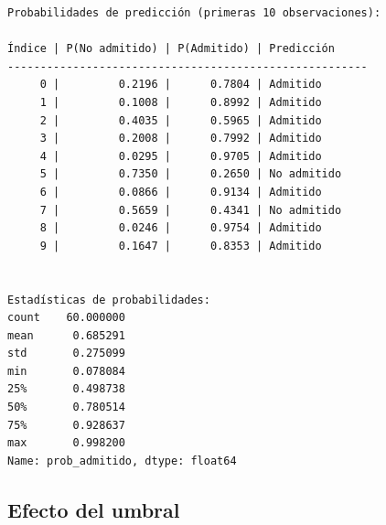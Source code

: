 \documentclass[
  doc,
  floatsintext,
  longtable,
  a4paper,
  nolmodern,
  notxfonts,
  notimes,
  12pt,
  colorlinks=true,linkcolor=blue,citecolor=blue,urlcolor=blue]{apa7}
\begin{document}
\begin{verbatim}
Probabilidades de predicción (primeras 10 observaciones):

Índice | P(No admitido) | P(Admitido) | Predicción
-------------------------------------------------------
     0 |         0.2196 |      0.7804 | Admitido
     1 |         0.1008 |      0.8992 | Admitido
     2 |         0.4035 |      0.5965 | Admitido
     3 |         0.2008 |      0.7992 | Admitido
     4 |         0.0295 |      0.9705 | Admitido
     5 |         0.7350 |      0.2650 | No admitido
     6 |         0.0866 |      0.9134 | Admitido
     7 |         0.5659 |      0.4341 | No admitido
     8 |         0.0246 |      0.9754 | Admitido
     9 |         0.1647 |      0.8353 | Admitido


Estadísticas de probabilidades:
count    60.000000
mean      0.685291
std       0.275099
min       0.078084
25%       0.498738
50%       0.780514
75%       0.928637
max       0.998200
Name: prob_admitido, dtype: float64
\end{verbatim}

\subsection{Efecto del umbral}\label{efecto-del-umbral}
\end{document}
